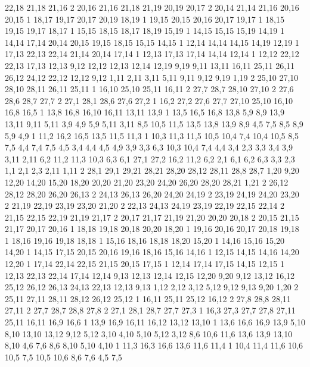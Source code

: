 22,18
21,18
21,16
2%
20,16
21,16
21,18
21,19
20,19
20,17
2%
20,14
21,14
21,16
20,16
20,15
1%
18,17
19,17
20,17
20,19
18,19
1%
19,15
20,15
20,16
20,17
19,17
1%
18,15
19,15
19,17
18,17
1%
15,15
18,15
18,17
18,19
15,19
1%
14,15
15,15
15,19
14,19
1%
14,14
17,14
20,14
20,15
19,15
18,15
15,15
14,15
1%
12,14
14,14
14,15
14,19
12,19
1%
17,13
22,13
22,14
21,14
20,14
17,14
1%
12,13
17,13
17,14
14,14
12,14
1%
12,12
22,12
22,13
17,13
12,13
%
9,12
12,12
12,13
12,14
12,19
9,19
%
9,11
13,11
16,11
25,11
26,11
26,12
24,12
22,12
12,12
9,12
%
1,11
2,11
3,11
5,11
9,11
9,12
9,19
1,19
2%
25,10
27,10
28,10
28,11
26,11
25,11
1%
16,10
25,10
25,11
16,11
2%
27,7
28,7
28,10
27,10
2%
27,6
28,6
28,7
27,7
2%
27,1
28,1
28,6
27,6
27,2
1%
16,2
27,2
27,6
27,7
27,10
25,10
16,10
16,8
16,5
1%
13,8
16,8
16,10
16,11
13,11
13,9
1%
13,5
16,5
16,8
13,8
%
5,9
8,9
13,9
13,11
9,11
5,11
%
3,9
4,9
5,9
5,11
3,11
%
8,5
10,5
11,5
13,5
13,8
13,9
8,9
%
4,5
7,5
8,5
8,9
5,9
4,9
1%
11,2
16,2
16,5
13,5
11,5
11,3
1%
10,3
11,3
11,5
10,5
10,4
%
7,4
10,4
10,5
8,5
7,5
%
4,4
7,4
7,5
4,5
%
3,4
4,4
4,5
4,9
3,9
%
3,3
6,3
10,3
10,4
7,4
4,4
3,4
%
2,3
3,3
3,4
3,9
3,11
2,11
%
6,2
11,2
11,3
10,3
6,3
%
6,1
27,1
27,2
16,2
11,2
6,2
%
2,1
6,1
6,2
6,3
3,3
2,3
%
1,1
2,1
2,3
2,11
1,11
2%
28,1
29,1
29,21
28,21
28,20
28,12
28,11
28,8
28,7
%
1,20
9,20
12,20
14,20
15,20
18,20
20,20
21,20
23,20
24,20
26,20
28,20
28,21
1,21
2%
26,12
28,12
28,20
26,20
26,13
2%
24,13
26,13
26,20
24,20
24,19
2%
23,19
24,19
24,20
23,20
2%
21,19
22,19
23,19
23,20
21,20
2%
22,13
24,13
24,19
23,19
22,19
22,15
22,14
2%
21,15
22,15
22,19
21,19
21,17
2%
20,17
21,17
21,19
21,20
20,20
20,18
2%
20,15
21,15
21,17
20,17
20,16
1%
18,18
19,18
20,18
20,20
18,20
1%
19,16
20,16
20,17
20,18
19,18
1%
18,16
19,16
19,18
18,18
1%
15,16
18,16
18,18
18,20
15,20
1%
14,16
15,16
15,20
14,20
1%
14,15
17,15
20,15
20,16
19,16
18,16
15,16
14,16
1%
12,15
14,15
14,16
14,20
12,20
1%
17,14
22,14
22,15
21,15
20,15
17,15
1%
12,14
17,14
17,15
14,15
12,15
1%
12,13
22,13
22,14
17,14
12,14
%
9,13
12,13
12,14
12,15
12,20
9,20
%
9,12
13,12
16,12
25,12
26,12
26,13
24,13
22,13
12,13
9,13
%
1,12
2,12
3,12
5,12
9,12
9,13
9,20
1,20
2%
25,11
27,11
28,11
28,12
26,12
25,12
1%
16,11
25,11
25,12
16,12
2%
27,8
28,8
28,11
27,11
2%
27,7
28,7
28,8
27,8
2%
27,1
28,1
28,7
27,7
27,3
1%
16,3
27,3
27,7
27,8
27,11
25,11
16,11
16,9
16,6
1%
13,9
16,9
16,11
16,12
13,12
13,10
1%
13,6
16,6
16,9
13,9
%
5,10
8,10
13,10
13,12
9,12
5,12
%
3,10
4,10
5,10
5,12
3,12
%
8,6
10,6
11,6
13,6
13,9
13,10
8,10
%
4,6
7,6
8,6
8,10
5,10
4,10
1%
11,3
16,3
16,6
13,6
11,6
11,4
1%
10,4
11,4
11,6
10,6
10,5
%
7,5
10,5
10,6
8,6
7,6
%
4,5
7,5

